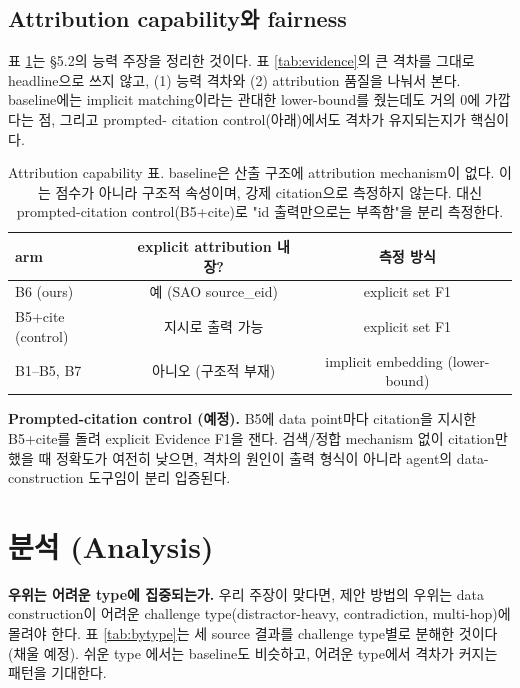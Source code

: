 \documentclass[11pt]{article}
\begin{document}
\subsection{Attribution capability와 fairness}
\label{sec:fairness-result}

표 \ref{tab:capability}는 \S5.2의 능력 주장을 정리한 것이다. 표 \ref{tab:evidence}의 큰 격차를
그대로 headline으로 쓰지 않고, (1) 능력 격차와 (2) attribution 품질을 나눠서 본다. baseline에는
implicit matching이라는 관대한 lower-bound를 줬는데도 거의 0에 가깝다는 점, 그리고 prompted-
citation control(아래)에서도 격차가 유지되는지가 핵심이다.

\begin{table}[h]
\centering
\small
\begin{tabular}{lcc}
\toprule
arm & explicit attribution 내장? & 측정 방식 \\
\midrule
B6 (ours) & 예 (SAO source\_eid) & explicit set F1 \\
B5+cite (control) & 지시로 출력 가능 & explicit set F1 \\
B1--B5, B7 & 아니오 (구조적 부재) & implicit embedding (lower-bound) \\
\bottomrule
\end{tabular}
\caption{Attribution capability 표. baseline은 산출 구조에 attribution mechanism이 없다.
이는 점수가 아니라 구조적 속성이며, 강제 citation으로 측정하지 않는다. 대신 prompted-citation
control(B5+cite)로 "id 출력만으로는 부족함"을 분리 측정한다.}
\label{tab:capability}
\end{table}

\textbf{Prompted-citation control (예정).} B5에 data point마다 citation을 지시한 B5+cite를
돌려 explicit Evidence F1을 잰다. 검색/정합 mechanism 없이 citation만 했을 때 정확도가 여전히
낮으면, 격차의 원인이 출력 형식이 아니라 agent의 data-construction 도구임이 분리 입증된다.

\section{분석 (Analysis)}
\label{sec:analysis}

\textbf{우위는 어려운 type에 집중되는가.} 우리 주장이 맞다면, 제안 방법의 우위는 data
construction이 어려운 challenge type(distractor-heavy, contradiction, multi-hop)에 몰려야 한다.
표 \ref{tab:bytype}는 세 source 결과를 challenge type별로 분해한 것이다(채울 예정). 쉬운 type
에서는 baseline도 비슷하고, 어려운 type에서 격차가 커지는 패턴을 기대한다.
\end{document}
